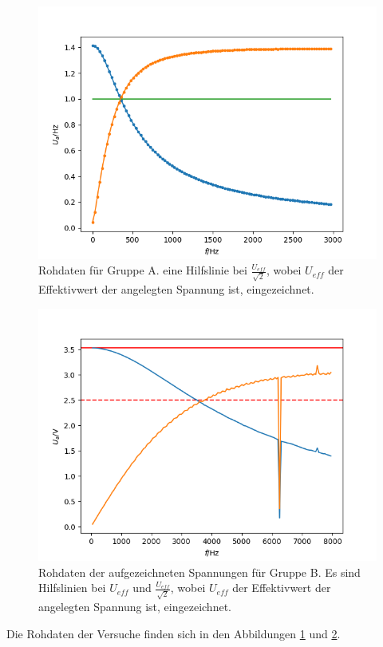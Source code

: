 \documentclass[12pt,a4paper]{article}
\begin{document}
\begin{figure}
\centering
\includegraphics[scale=1.0]{Bilder/RohdatenHochTief_A.png}
\caption{Rohdaten für Gruppe A. eine Hilfslinie bei $\frac{U_{eff}}{\sqrt{2}}$, wobei $U_{eff}$ der Effektivwert der angelegten Spannung ist, eingezeichnet.}
\label{fig:RohdatenHochTief_A}
\end{figure}

\begin{figure}
\centering
\includegraphics[scale=1.0]{Bilder/RohdatenHochTief_B.png}
\caption{Rohdaten der aufgezeichneten Spannungen für Gruppe B. Es sind Hilfslinien bei $U_{eff}$ und $\frac{U_{eff}}{\sqrt{2}}$, wobei $U_{eff}$ der Effektivwert der angelegten Spannung ist, eingezeichnet.}
\label{fig:RohdatenHochTief_B}
\end{figure}

Die Rohdaten der Versuche finden sich in den Abbildungen \ref{fig:RohdatenHochTief_A} und \ref{fig:RohdatenHochTief_B}.
\end{document}
